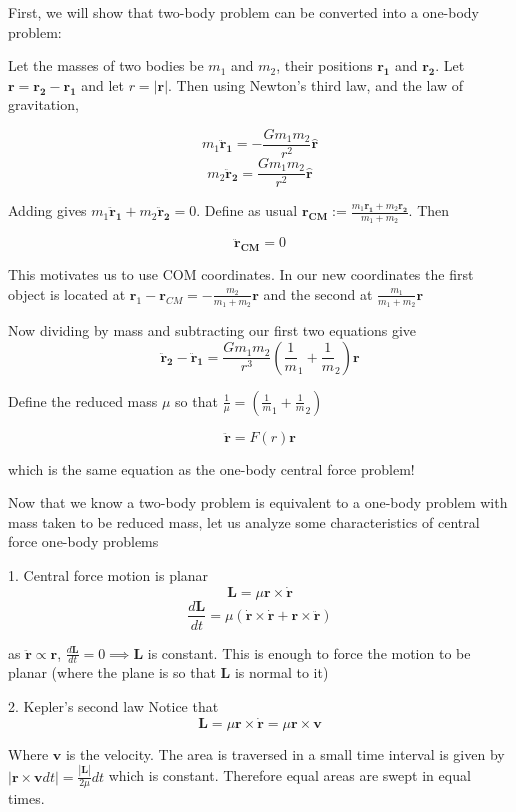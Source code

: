 \documentclass[11]{article}
\title{\sc{Introductory Orbital Mechanics Notes}}
\author{\sc{Rahul}}
\date{April 4, 2025}
\begin{document}
\maketitle
First, we will show that two-body problem can be converted into a one-body problem: 

Let the masses of two bodies be $m_1$ and $m_2$, their positions $\boldsymbol{r_1}$ and $\boldsymbol{r_2}$. Let $\boldsymbol r = \boldsymbol{r_2} - \boldsymbol{r_1}$ and let $r = |\boldsymbol{r}|$. Then using Newton's third law, and the law of gravitation, 

\[m_1 \boldsymbol{\ddot r_1} = -\frac{Gm_1 m_2}{r^2} \boldsymbol{\hat r} \]
\[m_2 \boldsymbol{\ddot r_2} = \frac{Gm_1 m_2}{r^2}  \boldsymbol{\hat r} \]

Adding gives $m_1 \boldsymbol{\ddot r_1} + m_2 \boldsymbol{\ddot r_2} = 0$. Define as usual $\boldsymbol{r_{CM}} := \frac{m_1 \boldsymbol{r_1} + m_2 \boldsymbol{r_2}}{m_1 + m_2}$. Then 

\[\boldsymbol{\ddot r_{CM}} = 0\]

This motivates us to use COM coordinates. In our new coordinates the first object is located at $\boldsymbol r_1 - \boldsymbol r_{CM} = -\frac{m_2}{m_1 + m_2} \boldsymbol{r}$ and the second at $\frac{m_1}{m_1 + m_2} \boldsymbol{r}$

Now dividing by mass and subtracting our first two equations give
\[ \boldsymbol{\ddot r_2} - \boldsymbol{\ddot r_1} = \frac{Gm_1 m_2}{r^3} \left(\frac1m_1 + \frac1m_2\right) \boldsymbol r \]

Define the reduced mass $\mu$ so that $\frac1\mu = \left(\frac1m_1 + \frac1m_2\right)$

\[ \boldsymbol{\ddot{r}} =F(r) \boldsymbol{r} \]

which is the same equation as the one-body central force problem!

Now that we know a two-body problem is equivalent to a one-body problem with mass taken to be reduced mass, let us analyze some characteristics of central force one-body problems

1. Central force motion is planar
\[ \mathbf{L} = \mu \boldsymbol r \times \boldsymbol{\dot{r}} \]
\[ \frac{d\mathbf{L}}{dt} = \mu \left( \boldsymbol{\dot{r}} \times \boldsymbol{\dot{r}} + \boldsymbol{r} \times \boldsymbol{\ddot{r}} \right)\]

as $\boldsymbol{\ddot{r}} \propto \boldsymbol{r}$, $\frac{d\mathbf{L}}{dt} = 0 \implies \mathbf{L}$ is constant. This is enough to force the motion to be planar (where the plane is so that $\mathbf L$ is normal to it)


2. Kepler's second law
Notice that \[ \mathbf{L} = \mu \boldsymbol r \times \boldsymbol{\dot{r}} = \mu \boldsymbol r \times \boldsymbol v \]

Where $\boldsymbol v$ is the velocity. The area is traversed in a small time interval is given by $|\boldsymbol r \times \boldsymbol v dt| = \frac{|\mathbf L|}{2\mu} dt$ which is constant. Therefore equal areas are swept in equal times.
\end{document}
